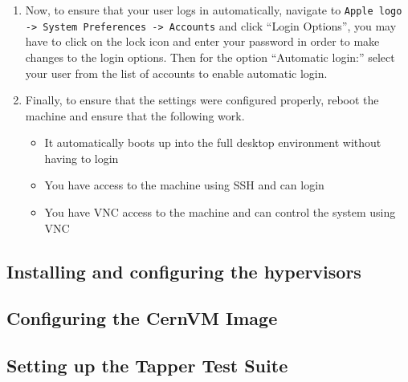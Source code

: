 \begin{enumerate}
\item	Now, to ensure that your user logs in automatically, navigate to \verb|Apple logo -> System Preferences -> Accounts| and click
		``Login Options'', you may have to click on the lock icon and enter your password in order to make changes to the login options. 
		Then for the option ``Automatic login:'' select your user from the list of accounts to enable automatic login.
		
\item 	Finally, to ensure that the settings were configured properly, reboot the machine and ensure that the following work.
\begin{itemize}
\item	It automatically boots up into the full desktop environment without having to login
\item	You have access to the machine using SSH and can login
\item	You have VNC access to the machine and can control the system using VNC	
\end{itemize}
\end{enumerate}


\newpage
\subsection{Installing and configuring the hypervisors}
\subsection{Configuring the CernVM Image}
\subsection{Setting up the Tapper Test Suite}